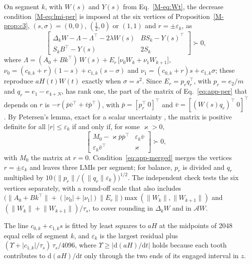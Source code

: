 On segment $k$, with $W(s)$ and $Y(s)$ from Eq.~\eqref{M-eq:Wt}, the decrease condition~\eqref{M-eq:lmi-per} is imposed at the six vertices of Proposition~\ref{M-prop:c3}, $(s,\sigma)=(0,0)$, $(\tfrac12,0)$ or $(1,1)$ and $r=\pm\varepsilon_k$, as
\begin{equation}\label{eq:app-per}
\begin{bmatrix}\Delta_kW-\Lambda-\Lambda^\top-2\lambda W(s) & BS_k-Y(s)^\top\\ S_kB^\top-Y(s) & 2S_k\end{bmatrix}\succ0,
\end{equation}
where $\Lambda=(A_0+Bk^\top)\,W(s)+E_r\,\big[\nu_0W_k+\nu_1W_{k+1}\big]$, $\nu_0=(c_{0,k}+r)(1-s)+c_{1,k}(s-\sigma)$ and $\nu_1=(c_{0,k}+r)s+c_{1,k}\sigma$; these reproduce $aH(t)W(t)$ exactly when $\sigma=s^2$. Since $E_r=p_rq_r^\top$, with $p_r=e_2/m$ and $q_r=e_1-e_{4+N}$, has rank one, the part of the matrix of Eq.~\eqref{eq:app-per} that depends on $r$ is $-r(\bar p\bar v^\top+\bar v\bar p^\top)$, with $\bar p=[p_r^\top\ 0]^\top$ and $\bar v=[(W(s)q_r)^\top\ 0]^\top$. By Petersen's lemma, exact for a scalar uncertainty \citep{petersen1987stabilization}, the matrix is positive definite for all $\lvert r\rvert\le\varepsilon_k$ if and only if, for some $\varkappa>0$,
\begin{equation}\label{eq:app-merged}
\begin{bmatrix}M_0-\varkappa\bar p\bar p^\top & \varepsilon_k\bar v\\ \varepsilon_k\bar v^\top & \varkappa\end{bmatrix}\succ0,
\end{equation}
with $M_0$ the matrix at $r=0$. Condition~\eqref{eq:app-merged} merges the vertices $r=\pm\varepsilon_k$ and leaves three LMIs per segment; for balance, $p_r$ is divided and $q_r$ multiplied by $10\,\big(\lVert p_r\rVert/(\lVert q_r\rVert\varepsilon_k)\big)^{1/2}$. The independent check tests the six vertices separately, with a round-off scale that also includes $\big(\lVert A_0+Bk^\top\rVert+(\lvert\nu_0\rvert+\lvert\nu_1\rvert)\lVert E_r\rVert\big)\max(\lVert W_k\rVert,\lVert W_{k+1}\rVert)$ and $(\lVert W_k\rVert+\lVert W_{k+1}\rVert)/\tau_s$, to cover rounding in $\Delta_kW$ and in $\mathcal AW$.

The line $c_{0,k}+c_{1,k}s$ is fitted by least squares to $aH$ at the midpoints of 2048 equal cells of segment $k$, and $\varepsilon_k$ is the largest residual plus $(\Upsilon+\lvert c_{1,k}\rvert/\tau_s)\,\tau_s/4096$, where $\Upsilon\ge\lvert\mathrm d(aH)/\mathrm dt\rvert$ holds because each tooth contributes to $\mathrm d(aH)/\mathrm dt$ only through the two ends of its engaged interval in $z$.

